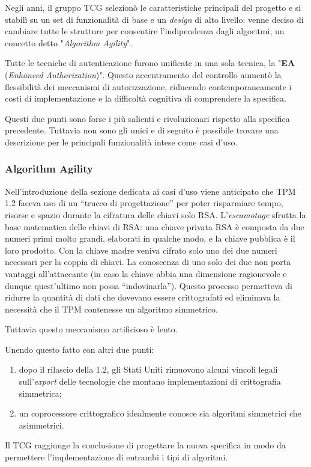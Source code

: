 Negli anni, il gruppo TCG selezionò le caratteristiche principali del progetto e si stabilì su un set di funzionalità di base e un \textit{design} di alto livello: venne deciso di cambiare tutte le strutture per consentire l'indipendenza dagli algoritmi, un concetto detto "\textit{Algorithm Agility}". 

Tutte le tecniche di autenticazione furono unificate in una sola tecnica, la "\textbf{EA} (\textit{Enhanced Authorization})". Questo accentramento del controllo aumentò la flessibilità dei meccanismi di autorizzazione, riducendo contemporaneamente i costi di implementazione e la difficoltà cognitiva di comprendere la specifica. 

Questi due punti sono forse i più salienti e rivoluzionari rispetto alla specifica precedente. Tuttavia non sono gli unici e di seguito è possibile trovare una descrizione per le principali funzionalità intese come casi d’uso.

\subsubsection{Algorithm Agility}
Nell’introduzione della sezione dedicata ai casi d’uso viene anticipato che TPM 1.2 faceva uso di un “trucco di progettazione” per poter risparmiare tempo, risorse e spazio durante la cifratura delle chiavi solo RSA.
L’\textit{escamotage} sfrutta la base matematica delle chiavi di RSA: una chiave privata RSA è composta da due numeri primi molto grandi, elaborati in qualche modo, e la chiave pubblica è il loro prodotto. Con la chiave madre veniva cifrato solo uno dei due numeri necessari per la coppia di chiavi. La conoscenza di uno solo dei due non porta vantaggi all’attaccante (in caso la chiave abbia una dimensione ragionevole e dunque quest’ultimo non possa “indovinarla”). Questo processo permetteva di ridurre la quantità di dati che dovevano essere crittografati ed eliminava la necessità che il TPM contenesse un algoritmo simmetrico. 

Tuttavia questo meccanismo artificioso è lento. 

Unendo questo fatto con altri due punti:
\begin{enumerate}
    \item dopo il rilascio della 1.2, gli Stati Uniti rimuovono alcuni vincoli legali sull’\textit{export} delle tecnologie che montano implementazioni di crittografia simmetrica;
    \item un coprocessore crittografico idealmente conosce sia algoritmi simmetrici che asimmetrici.
\end{enumerate}
Il TCG raggiunge la conclusione di progettare la nuova specifica in modo da permettere l’implementazione di entrambi i tipi di algoritmi.

